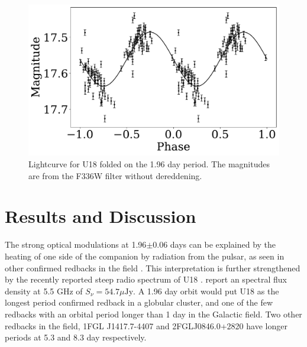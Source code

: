 \documentclass[fleqn,usenatbib,useAMS,letters]{mnras}
\begin{document}



 \begin{figure}
	\includegraphics[width =\columnwidth]{folded-eps-converted-to.pdf}
	\vspace{-0.5 cm}
    \caption{Lightcurve for U18 folded on the 1.96 day period. The magnitudes are from the F336W filter without dereddening. }
    \label{fig:folded}
\end{figure}

 
 \section{Results and Discussion}
 

 
 The strong optical modulations at 1.96$\pm$0.06 days can be explained by the heating of one side of the companion by radiation from the pulsar, as seen in other confirmed redbacks in the field \citep[e.g.,][]{Hui2015PSR2219,salvetti2015J2039}.  This interpretation is further strengthened by the recently reported steep radio spectrum of U18 \citep{CoryPaper}. \citet{CoryPaper} report an spectral flux density at 5.5 GHz of $S_\nu =54.7 \mu\text{Jy}$. A 1.96 day orbit would put U18 as the longest period confirmed redback in a globular cluster, and one of the few redbacks with an orbital period longer than 1 day in the Galactic field. Two other redbacks in the field, 1FGL J1417.7-4407 \citep{Strader2015,Camilo2016,Swihart2018} and 2FGLJ0846.0+2820 \citep{Swihart2017} have longer periods at 5.3 and 8.3 day respectively. %
 
\end{document}
